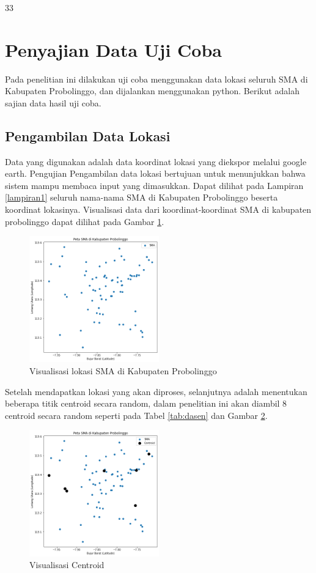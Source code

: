 33\section{Penyajian Data Uji Coba}

Pada penelitian ini dilakukan uji coba menggunakan data lokasi seluruh SMA di Kabupaten Probolinggo, dan dijalankan menggunakan python. Berikut adalah sajian data hasil uji coba.

\subsection{Pengambilan Data Lokasi}

Data yang digunakan adalah data koordinat lokasi yang diekspor melalui google earth. Pengujian Pengambilan data lokasi bertujuan untuk menunjukkan bahwa sistem 
mampu membaca input yang dimasukkan. Dapat dilihat pada Lampiran \ref{lampiran1} seluruh nama-nama SMA di Kabupaten Probolinggo beserta koordinat lokasinya. Visualisasi data dari koordinat-koordinat SMA di kabupaten probolinggo dapat dilihat pada Gambar \ref{fig:petasma}.

\begin{figure}[H]
  \centering
  \includegraphics[width=0.5\textwidth]{Gambar/peta sma.png}
  \caption{Visualisasi lokasi SMA di Kabupaten Probolinggo}
  \label{fig:petasma}
\end{figure}

Setelah mendapatkan lokasi yang akan diproses, selanjutnya adalah menentukan beberapa titik centroid secara random, dalam penelitian ini akan diambil 8 centroid secara random seperti pada Tabel \ref{tab:dasen} dan Gambar \ref{fig:visdasen}.



\begin{figure}[H]
	\centering
	\includegraphics[width=0.5\textwidth]{Gambar/titik centroid.png}
	\caption{Visualisasi Centroid}
	\label{fig:visdasen}
\end{figure}

